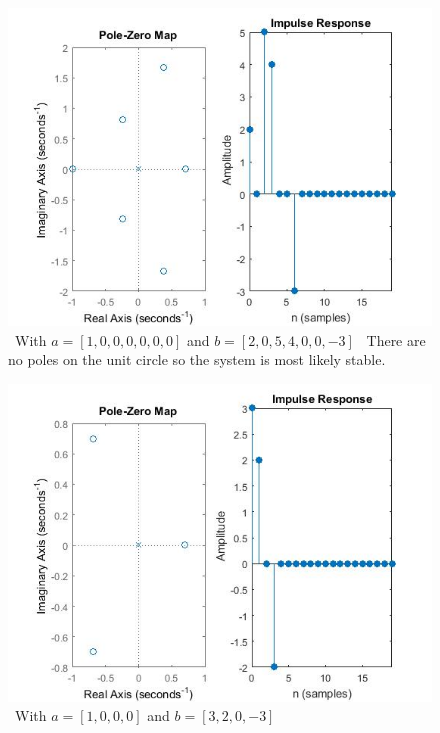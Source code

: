 \documentclass{article}
\begin{document}
\begin{figure}[H]

\includegraphics[scale = .5]{report5_1}
\ With $a = [1,0,0,0,0,0,0]$ and $b =[2,0,5,4,0,0,-3]$
\ There are no poles on the unit circle so the system is most likely stable.
\end{figure}

\begin{figure}[H]
\includegraphics[scale = .5]{report5_2}
\ With $a = [1,0,0,0]$ and $b = [3,2,0,-3]$
\end{figure}
\end{document}
